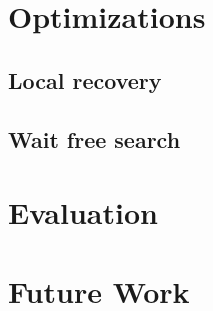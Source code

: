 \documentclass{beamer}
\begin{document}
\section{Optimizations}

\subsection{Local recovery}


\subsection{Wait free search}


\section{Evaluation}


\section{Future Work}

\end{document}
